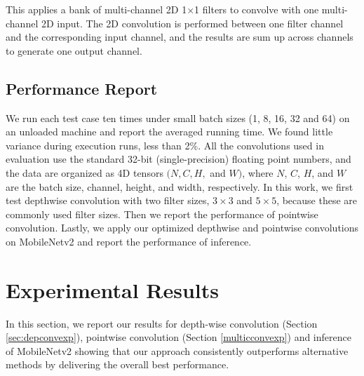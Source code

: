  This applies a bank of multi-channel 2D 1$\times$1 filters to convolve with one multi-channel 2D input. 
The 2D convolution is performed between one filter channel and the corresponding input channel, and the results are sum up across channels to generate one output channel.


\subsection{Performance Report}
We run each test case ten times under small batch sizes (1, 8, 16, 32 and 64) on an unloaded machine and report the averaged running time. 
We found little variance during execution runs, less than 2\%.  
All the convolutions used in evaluation use the standard 32-bit (single-precision) floating point numbers, and the data are organized as 4D tensors $(N,C,H,$ and $W)$, where $N$, $C$, $H$, and $W$ are the batch size, channel, height, and width, respectively. 
In this work, we first test depthwise convolution with two filter sizes, $3 \times 3$ and $5 \times 5$, because these are commonly used filter sizes. 
Then we report the performance of pointwise convolution. 
Lastly, we apply our optimized depthwise and pointwise convolutions on MobileNetv2 and report the performance of inference.
%

\section{Experimental Results}
\label{exp} In this section, we report our results for depth-wise convolution (Section \ref{sec:depconvexp}), pointwise convolution (Section \ref {multicconvexp}) and inference of MobileNetv2 showing that our approach consistently outperforms alternative methods by delivering the overall best performance.


